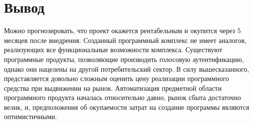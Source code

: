 \section{Вывод}
Можно прогнозировать, что проект окажется рентабельным и окупится через 5 месяцев после внедрения.
Созданный программный комплекс не имеет аналогов, реализующих все функциональные возможности комплекса. Существуют программные продукты, позволяющие производить голосовую аутентификацию, однако они нацелены на другой потребительский сектор. В силу вышесказанного, представляется довольно сложным оценить цену реализации программного средства при выдвижении на рынок. Автоматизация предметной области программного продукта началась относительно давно, рынок сбыта достаточно велик, и, предположения об окупаемости затрат на создание программы являются оптимистичными.
